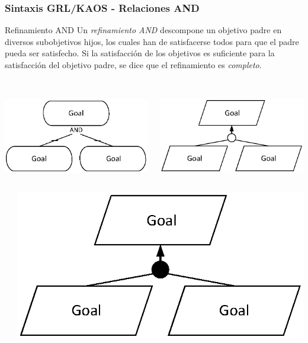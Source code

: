 \documentclass[slidestop,xcolor=pst,dvips,blue]{beamer}
\begin{document}
\begin{frame}[c]
    \frametitle{Sintaxis GRL/KAOS - Relaciones AND}
    \begin{block}{Refinamiento AND}
        Un \alert{\emph{refinamiento AND}} descompone un objetivo padre en diversos subobjetivos hijos, los cuales han de satisfacerse todos para que el padre pueda ser satisfecho. Si la satisfacción de los objetivos es suficiente para la satisfacción del objetivo padre, se dice que el refinamiento es \emph{completo}.
        \ \\
        \ \\
        \begin{columns}[c]
            \begin{column}{.50\linewidth}
                \centering \includegraphics[width=0.65\columnwidth,keepaspectratio=true]{images/objetivos/andRef(GRL).eps}
            \end{column}
            \begin{column}{.50\linewidth}
                \centering \includegraphics[width=0.65\columnwidth,keepaspectratio=true]{images/objetivos/andRef(KAOS).eps}
            \end{column}
        \end{columns}
        \begin{columns}[c]
            \begin{column}{.50\linewidth}
            \end{column}
            \begin{column}{.50\linewidth}
                \centering \includegraphics[width=0.65\columnwidth,keepaspectratio=true]{images/objetivos/andRef(complete)(KAOS).eps}
            \end{column}
        \end{columns}
     \end{block}
\end{frame}
\end{document}
